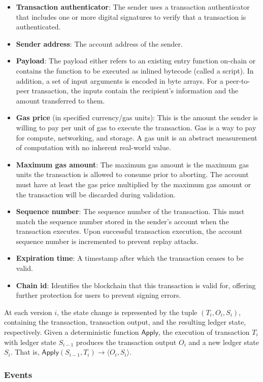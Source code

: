 \documentclass{article}
\begin{document}
\begin{itemize}
\item \textbf{Transaction authenticator}: The sender uses a transaction authenticator that includes one or more digital signatures to verify that a transaction is authenticated.
\item \textbf{Sender address}: The account address of the sender.
\item \textbf{Payload}: The payload either refers to an existing entry function on-chain or contains the function to be executed as inlined bytecode (called a script). In addition, a set of input arguments is encoded in byte arrays. For a peer-to-peer transaction, the inputs contain the recipient's information and the amount transferred to them.
\item \textbf{Gas price} (in specified currency/gas units): This is the amount the sender is willing to pay per unit of gas to execute the transaction. Gas is a way to pay for compute, networking, and storage. A gas unit is an abstract measurement of computation with no inherent real-world value.
\item \textbf{Maximum gas amount}: The maximum gas amount is the maximum gas units the transaction is allowed to consume prior to aborting. The account must have at least the gas price multiplied by the maximum gas amount or the transaction will be discarded during validation.
\item \textbf{Sequence number}: The sequence number of the transaction. This must match the sequence number stored in the sender's account when the transaction executes. Upon successful transaction execution, the account sequence number is incremented to prevent replay attacks.
\item \textbf{Expiration time}: A timestamp after which the transaction ceases to be valid.
\item \textbf{Chain id}: Identifies the blockchain that this transaction is valid for, offering further protection for users to prevent signing errors.
\end{itemize}
At each version $i$, the state change is represented by the tuple $(T_i, O_i, S_i)$, containing the transaction, transaction output, and the resulting ledger state, respectively. Given a deterministic function $\textsf{Apply}$, the execution of transaction $T_i$ with ledger state $S_{i-1}$ produces the transaction output $O_i$ and a new ledger state $S_i$. That is, $\textsf{Apply}(S_{i-1}, T_i) \rightarrow \langle O_i, S_i\rangle$. 

\subsubsection{Events}
\label{subsub:events}
\end{document}
